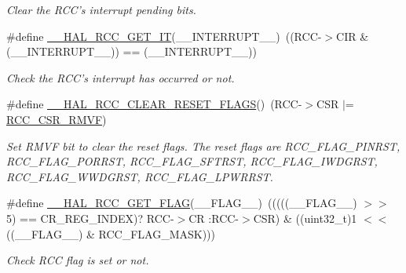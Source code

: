 \begin{DoxyCompactItemize}
\begin{DoxyCompactList}\small\item\em Clear the R\-C\-C's interrupt pending bits. \end{DoxyCompactList}\item 
\#define \hyperlink{group___r_c_c___flags___interrupts___management_ga134af980b892f362c05ae21922cd828d}{\-\_\-\-\_\-\-H\-A\-L\-\_\-\-R\-C\-C\-\_\-\-G\-E\-T\-\_\-\-I\-T}(\-\_\-\-\_\-\-I\-N\-T\-E\-R\-R\-U\-P\-T\-\_\-\-\_\-)~((R\-C\-C-\/$>$C\-I\-R \& (\-\_\-\-\_\-\-I\-N\-T\-E\-R\-R\-U\-P\-T\-\_\-\-\_\-)) == (\-\_\-\-\_\-\-I\-N\-T\-E\-R\-R\-U\-P\-T\-\_\-\-\_\-))
\begin{DoxyCompactList}\small\item\em Check the R\-C\-C's interrupt has occurred or not. \end{DoxyCompactList}\item 
\hypertarget{group___r_c_c___flags___interrupts___management_gaf28c11b36035ef1e27883ff7ee2c46b0}{\#define \hyperlink{group___r_c_c___flags___interrupts___management_gaf28c11b36035ef1e27883ff7ee2c46b0}{\-\_\-\-\_\-\-H\-A\-L\-\_\-\-R\-C\-C\-\_\-\-C\-L\-E\-A\-R\-\_\-\-R\-E\-S\-E\-T\-\_\-\-F\-L\-A\-G\-S}()~(R\-C\-C-\/$>$C\-S\-R $\vert$= \hyperlink{group___peripheral___registers___bits___definition_gafc26c5996b14005a70afbeaa29aae716}{R\-C\-C\-\_\-\-C\-S\-R\-\_\-\-R\-M\-V\-F})}\label{group___r_c_c___flags___interrupts___management_gaf28c11b36035ef1e27883ff7ee2c46b0}

\begin{DoxyCompactList}\small\item\em Set R\-M\-V\-F bit to clear the reset flags. The reset flags are R\-C\-C\-\_\-\-F\-L\-A\-G\-\_\-\-P\-I\-N\-R\-S\-T, R\-C\-C\-\_\-\-F\-L\-A\-G\-\_\-\-P\-O\-R\-R\-S\-T, R\-C\-C\-\_\-\-F\-L\-A\-G\-\_\-\-S\-F\-T\-R\-S\-T, R\-C\-C\-\_\-\-F\-L\-A\-G\-\_\-\-I\-W\-D\-G\-R\-S\-T, R\-C\-C\-\_\-\-F\-L\-A\-G\-\_\-\-W\-W\-D\-G\-R\-S\-T, R\-C\-C\-\_\-\-F\-L\-A\-G\-\_\-\-L\-P\-W\-R\-R\-S\-T. \end{DoxyCompactList}\item 
\#define \hyperlink{group___r_c_c___flags___interrupts___management_gae2d7d461630562bf2a2ddb31b1f96449}{\-\_\-\-\_\-\-H\-A\-L\-\_\-\-R\-C\-C\-\_\-\-G\-E\-T\-\_\-\-F\-L\-A\-G}(\-\_\-\-\_\-\-F\-L\-A\-G\-\_\-\-\_\-)~(((((\-\_\-\-\_\-\-F\-L\-A\-G\-\_\-\-\_\-) $>$$>$ 5) == C\-R\-\_\-\-R\-E\-G\-\_\-\-I\-N\-D\-E\-X)? R\-C\-C-\/$>$C\-R \-:R\-C\-C-\/$>$C\-S\-R) \& ((uint32\-\_\-t)1 $<$$<$ ((\-\_\-\-\_\-\-F\-L\-A\-G\-\_\-\-\_\-) \& R\-C\-C\-\_\-\-F\-L\-A\-G\-\_\-\-M\-A\-S\-K)))
\begin{DoxyCompactList}\small\item\em Check R\-C\-C flag is set or not. \end{DoxyCompactList}\end{DoxyCompactItemize}


